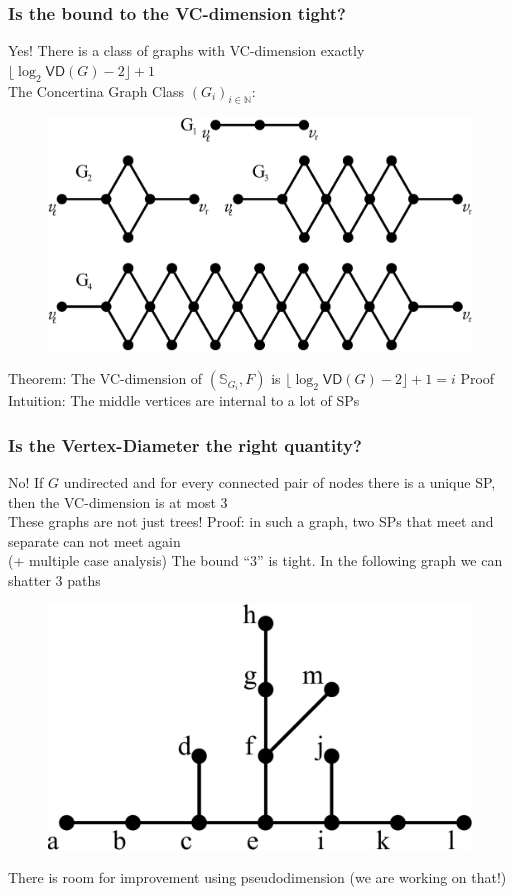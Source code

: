 \begin{frame}
  \frametitle{Is the bound to the VC-dimension tight?}
  Yes! There is a class of graphs with VC-dimension exactly
  $\lfloor\log_2\mathsf{VD}(G) -2\rfloor +1$\\
  \quad The Concertina Graph Class $(G_i)_{i\in\mathbb{N}}$:
  \begin{figure}[H]
    \centering
    \includegraphics[scale=0.3]{imgs/concertina.pdf}
  \end{figure}
  \vfill
  Theorem: The VC-dimension of $(\mathbb{S}_{G_i}, F)$ is
  $\lfloor\log_2\mathsf{VD}(G) -2\rfloor +1=i$
  \vfill
  Proof Intuition: The middle vertices are internal to a lot of SPs
\end{frame}

\begin{frame}
  \frametitle{Is the Vertex-Diameter the right quantity?}
  No! If $G$ undirected and for every connected pair of nodes there is a
  unique SP, then the VC-dimension is at most 3\\
  \quad These graphs are not just trees!
  \vfill
  Proof: in such a graph, two SPs that meet and separate can not meet again\\
  \quad (+ multiple case analysis)
  \vfill
  The bound ``3'' is tight. In the following graph we can shatter 3 paths
  \begin{figure}[H]
    \centering
    \includegraphics[scale=0.3]{imgs/uniqueshortestpathtight.pdf}
  \end{figure}
  \vfill
  There is room for improvement using pseudodimension (we are working on that!)
\end{frame}

